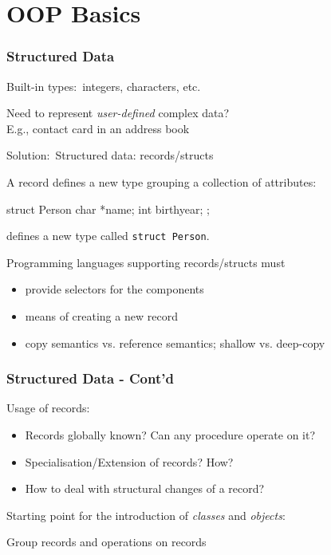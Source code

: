 \documentclass{beamer}
\newcommand{\Blue}[1]{\color{blue}#1\color{black}}
\begin{document}
\section{OOP Basics}
\begin{frame}[fragile]
\frametitle{Structured Data}
\Blue{Built-in types:}\ integers, characters, etc.

\bigskip

\Blue{Need to represent \emph{user-defined} complex data?}\\
E.g., contact card in an address book

\bigskip

\Blue{Solution:}\ Structured data: records/structs 

A record defines a new type grouping a collection of attributes:

\begin{cplus3}
struct Person {
   char *name;
   int birthyear;
};
\end{cplus3}

defines a new type called \texttt{struct Person}.

Programming languages supporting records/structs must
\begin{itemize}
\item provide selectors for the components
\item means of creating a new record
\item copy semantics vs. reference semantics; shallow vs. deep-copy
\end{itemize}
\end{frame}


\begin{frame}[fragile]
\frametitle{Structured Data - Cont'd}

Usage of records:
\begin{itemize}
  \item<+-> Records globally known? Can any procedure operate on it? 
  \item<+-> Specialisation/Extension of records? How?
  \item<+-> How to deal with structural changes of a record?
\end{itemize}

\onslide<+->\bigskip\bigskip

Starting point for the introduction of \emph{classes} and
\emph{objects}:\\
\begin{center}
  Group records and operations on records
\end{center}

\end{frame}
\end{document}
